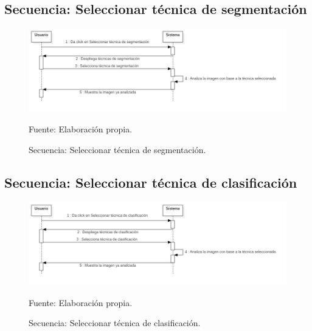 \documentclass[12pt]{report}
\begin{document}
\subsection{Secuencia: Seleccionar técnica de segmentación}
\begin{figure}[H]
\centering
\includegraphics[width = 12 cm, height = 7 cm]{segmentacion}
\caption{Secuencia: Seleccionar técnica de segmentación.}
Fuente: Elaboración propia.
\end{figure}

\subsection{Secuencia: Seleccionar técnica de clasificación}
\begin{figure}[H]
\centering
\includegraphics[width = 12 cm, height = 7 cm]{clasificacion}
\caption{Secuencia: Seleccionar técnica de clasificación.}
Fuente: Elaboración propia.
\end{figure}
\end{document}
